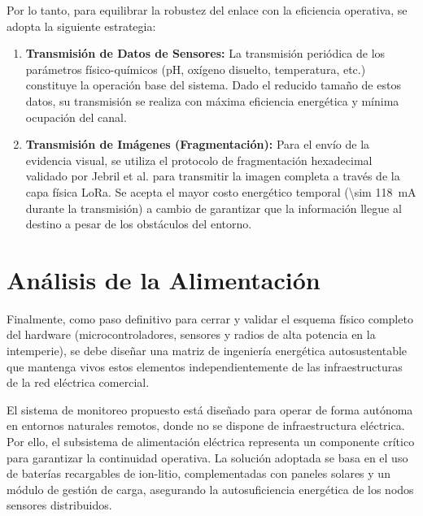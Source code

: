 Por lo tanto, para equilibrar la robustez del enlace con la eficiencia operativa, se adopta la siguiente estrategia:
\begin{enumerate}
    \item \textbf{Transmisión de Datos de Sensores:} La transmisión periódica de los parámetros físico-químicos (pH, oxígeno disuelto, temperatura, etc.) constituye la operación base del sistema. Dado el reducido tamaño de estos datos, su transmisión se realiza con máxima eficiencia energética y mínima ocupación del canal.
    \item \textbf{Transmisión de Imágenes (Fragmentación):} Para el envío de la evidencia visual, se utiliza el protocolo de fragmentación hexadecimal validado por Jebril et al. \cite{jebril2018overcoming} para transmitir la imagen completa a través de la capa física LoRa. Se acepta el mayor costo energético temporal (\SI{\sim 118}{\milli\ampere} durante la transmisión) a cambio de garantizar que la información llegue al destino a pesar de los obstáculos del entorno.
\end{enumerate}

\section{Análisis de la Alimentación}
\label{sec:analisis_alimentacion}
Finalmente, como paso definitivo para cerrar y validar el esquema físico completo del hardware (microcontroladores, sensores y radios de alta potencia en la intemperie), se debe diseñar una matriz de ingeniería energética autosustentable que mantenga vivos estos elementos independientemente de las infraestructuras de la red eléctrica comercial.



El sistema de monitoreo propuesto está diseñado para operar de forma autónoma en entornos naturales remotos, donde no se dispone de infraestructura eléctrica. Por ello, el subsistema de alimentación eléctrica representa un componente crítico para garantizar la continuidad operativa. La solución adoptada se basa en el uso de baterías recargables de ion-litio, complementadas con paneles solares y un módulo de gestión de carga, asegurando la autosuficiencia energética de los nodos sensores distribuidos.

